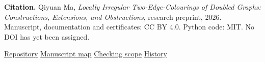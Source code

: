 \documentclass[11pt,a4paper]{article}
\begin{document}
\textbf{Citation.} Qiyuan Ma, \emph{Locally Irregular Two-Edge-Colourings
of Doubled Graphs: Constructions, Extensions, and Obstructions},
research preprint, 2026. Manuscript, documentation and certificates:
CC BY 4.0. Python code: MIT. No DOI has yet been assigned.\par
\href{https://github.com/KevinMaSAI/doubled-graphs-local-irregularity}{Repository}\quad
\href{https://github.com/KevinMaSAI/doubled-graphs-local-irregularity/blob/main/CONTENTS.md}{Manuscript map}\quad
\href{https://github.com/KevinMaSAI/doubled-graphs-local-irregularity/blob/main/VERIFICATION.md}{Checking scope}\quad
\href{https://github.com/KevinMaSAI/doubled-graphs-local-irregularity/blob/main/history.md}{History}
\end{document}
